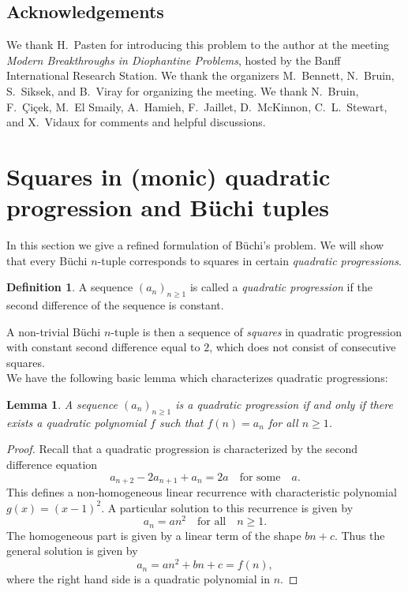 \documentclass[letterpaper,10pt]{amsart}
\newtheorem{lemma}[theorem]{Lemma}
\theoremstyle{definition}
\newtheorem{definition}[theorem]{Definition}
\numberwithin{equation}{section}
\begin{document}
	
	
	\subsection*{Acknowledgements} We thank H.~Pasten for introducing this problem to the author at the meeting \emph{Modern Breakthroughs in Diophantine Problems}, hosted by the Banff International Research Station. We thank the organizers M.~Bennett, N.~Bruin, S.~Siksek, and B.~Viray for organizing the meeting. We thank N.~Bruin, F.~\c{C}i\c{c}ek, M.~El Smaily, A.~Hamieh, F.~Jaillet, D.~McKinnon, C.~L.~Stewart, and X.~Vidaux for comments and helpful discussions. 
	

	
		
	\section{Squares in (monic) quadratic progression and B\"{u}chi tuples} 
	\label{monic} 
	
	In this section we give a refined formulation of B\"{u}chi's problem. We will show that every B\"{u}chi $n$-tuple corresponds to squares in certain \emph{quadratic progressions}. 
	
	\begin{definition} A sequence $(a_n)_{n \geq 1}$ is called a \emph{quadratic progression} if the second difference of the sequence is constant. 
	\end{definition}
	
	A non-trivial B\"{u}chi $n$-tuple is then a sequence of \emph{squares} in quadratic progression with constant second difference equal to $2$, which does not consist of consecutive squares. \\
	
	We have the following basic lemma which characterizes quadratic progressions:
	
	\begin{lemma} \label{quadprog} A sequence $(a_n)_{n \geq 1}$ is a quadratic progression if and only if there exists a quadratic polynomial $f$ such that $f(n) = a_n$ for all $n \geq 1$. 
	\end{lemma}
	
	\begin{proof} Recall that a quadratic progression is characterized by the second difference equation 
	\begin{equation} \label{secdiff} a_{n+2} - 2 a_{n+1} + a_n = 2a \quad \text{for some} \quad a.
	\end{equation}
	This defines a non-homogeneous linear recurrence with characteristic polynomial $g(x) = (x-1)^2$. A particular solution to this recurrence is given by 
	\[a_n = an^2 \quad \text{for all} \quad n \geq 1.\]
	The homogeneous part is given by a linear term of the shape $bn + c$. Thus the general solution is given by 
	\[a_n = an^2 + bn + c = f(n),\]
	where the right hand side is a quadratic polynomial in $n$. 
	\end{proof} 
	
\end{document}
